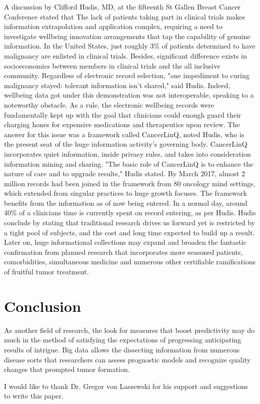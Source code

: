 \documentclass[sigconf]{acmart}
\begin{document}
A discussion by Clifford Hudis, MD, at the fifteenth St Gallen Breast Cancer Conference stated that The lack of patients taking part in clinical trials makes information extrapolation and application complex, requiring a need to investigate wellbeing innovation arrangements that tap the capability of genuine information\cite{Raghupathi2014}. 
In the United States, just roughly 3\% of patients determined to have malignancy are enlisted in clinical trials. Besides, significant difference exists in socioeconomics between members in clinical trials and the all inclusive community. Regardless of electronic record selection, "one impediment to curing malignancy stayed: tolerant information isn't shared," said Hudis. Indeed, wellbeing data got under this demonstration was not interoperable, speaking to a noteworthy obstacle. As a rule, the electronic wellbeing records were fundamentally kept up with the goal that clinicians could enough guard their charging hones for expensive medications and therapeutics upon review.
The answer for this issue was a framework called CancerLinQ, noted Hudis, who is the present seat of the huge information activity's governing body. CancerLinQ incorporates quiet information, inside privacy rules, and takes into consideration information mining and sharing. "The basic role of CancerLinQ is to enhance the nature of care and to upgrade results," Hudis stated\cite{Raghupathi2014}.
By March 2017, almost 2 million records had been joined in the framework from 80 oncology mind settings, which extended from singular practices to huge growth focuses. The framework benefits from the information as of now being entered. In a normal day, around 40\% of a clinicians time is currently spent on record entering, as per Hudis.
Hudis conclude by stating that traditional research drives us forward yet is restricted by a tight pool of subjects, and the cost and long time expected to build up a result. Later on, huge informational collections may expand and broaden the fantastic confirmation from planned research that incorporates more seasoned patients, comorbidities, simultaneous medicine and numerous other certifiable ramifications of fruitful tumor treatment\cite{Raghupathi2014}.



\section{Conclusion}

As another field of research, the look for measures that boost predictivity may do much in the method of satisfying the expectations of progressing anticipating results of intrigue. Big data allows the dissecting information from numerous disease sorts that researchers can assess prognostic models and recognize quality changes that prompted tumor formation.


\begin{acks}

  I would like to thank Dr. Gregor von Laszewski for his
  support and suggestions to write this paper.

\end{acks}



\end{document}
